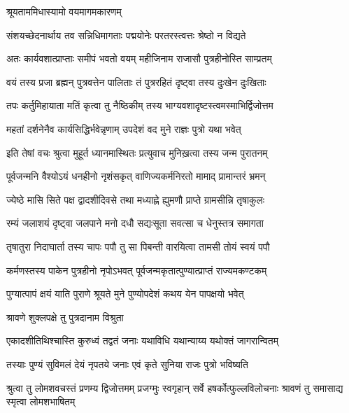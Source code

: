 \onelineshloka
{श्रूयताममिधास्यामो वयमागमकारणम्} %

\twolineshloka
{संशयच्छेदनार्थाय तव सन्निधिमागताः}
{पद्मयोनेः परतरस्त्वत्तः श्रेष्ठो न विद्यते} %

\twolineshloka
{अतः कार्यवशात्प्राप्ताः समीपं भवतो वयम्}
{महीजिनाम राजासौ पुत्रहीनोस्ति साम्प्रतम्} %

\twolineshloka
{वयं तस्य प्रजा ब्रह्मन् पुत्रवत्तेन पालिताः}
{तं पुत्ररहितं दृष्ट्वा तस्य दुःखेन दुःखिताः} %

\twolineshloka
{तपः कर्तुमिहायाता मतिं कृत्वा तु नैष्ठिकीम्}
{तस्य भाग्यवशादृष्टस्त्वमस्माभिर्द्विजोत्तम} %

\twolineshloka
{महतां दर्शनेनैव कार्यसिद्धिर्भवेन्नृणाम्}
{उपदेशं वद मुने राज्ञः पुत्रो यथा भवेत्} %

\twolineshloka
{इति तेषां वचः श्रुत्वा मुहूर्त ध्यानमास्थितः}
{प्रत्युवाच मुनिख़त्वा तस्य जन्म पुरातनम्} %


\twolineshloka
{पूर्वजन्मनि वैश्योऽयं धनहीनो नृशंसकृत्}
{वाणिज्यकर्मनिरतो मामाद् प्रामान्तरं भ्रमन्} %

\twolineshloka
{ज्येष्ठे मासि सिते पक्ष द्वादशीदिवसे तथा}
{मध्याह्ने ह्युमणौ प्राप्ते ग्रामसीन्नि तृषाकुलः} %

\twolineshloka
{रम्यं जलाशयं दृष्ट्वा जलपाने मनो दधौ}
{सद्यःसूता सवत्सा च धेनुस्तत्र समागता} %

\twolineshloka
{तृषातुरा निदाघार्ता तस्य चापः पपौ तु सा}
{पिबन्ती वारयित्वा तामसी तोयं स्वयं पपौ} %

\twolineshloka
{कर्मणस्तस्य पाकेन पुत्रहीनो नृपोऽभवत्}
{पूर्वजन्मकृतात्पुण्यात्प्राप्तं राज्यमकण्टकम्} %



\twolineshloka
{पुग्यात्पापं क्षयं याति पुराणे श्रूयते मुने}
{पुण्योपदेशं कथय येन पापक्षयो भवेत्} %



\onelineshloka
{श्रावणे शुक्लपक्षे तु पुत्रदानाम विश्रुता} %

\twolineshloka
{एकादशीतिथिश्चास्ति कुरुध्वं तद्वतं जनाः}
{यथाविधि यथान्याय्य यथोक्तं जागरान्वितम्} %

\twolineshloka
{तस्याः पुण्यं सुविमलं देयं नृपतये जनाः}
{एवं कृते सुनिया राजः पुत्रो भविष्यति} %

\threelineshloka
{श्रुत्वा तु लोमशवचस्तं प्रणम्य द्विजोत्तमम्}
{प्रजग्मुः स्वगृहान् सर्वे हषर्कोत्फुल्लविलोचनाः}
{श्रावणं तु समासाद्य स्मृत्वा लोमशभाषितम्} %

